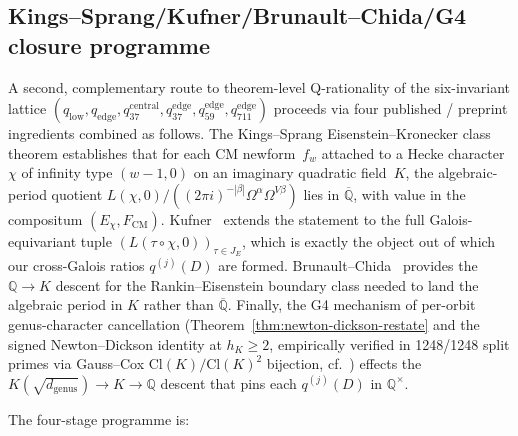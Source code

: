 \documentclass[11pt]{amsart}
\theoremstyle{definition}
\theoremstyle{remark}
\newcommand{\Q}{\mathbb{Q}}
\begin{document}
\subsection{Kings--Sprang/Kufner/Brunault--Chida/G4 closure programme}
\label{ss:ks-kufner-bc-g4}

A second, complementary route to theorem-level Q-rationality of the
six-invariant lattice $(q_{\mathrm{low}}, q_{\mathrm{edge}},
q_{37}^{\mathrm{central}}, q_{37}^{\mathrm{edge}}, q_{59}^{\mathrm{edge}},
q_{711}^{\mathrm{edge}})$ proceeds via four published / preprint
ingredients combined as follows. The Kings--Sprang
Eisenstein--Kronecker class theorem
\cite{KingsSprang2025} establishes that for each CM newform~$f_w$
attached to a Hecke character $\chi$ of infinity type $(w-1, 0)$ on
an imaginary quadratic field~$K$, the algebraic-period quotient
$L(\chi, 0)/((2\pi i)^{-|\beta|} \Omega^\alpha \Omega^{V\beta})$ lies
in $\overline{\Q}$, with value in the compositum
$(E_\chi, F_{\mathrm{CM}})$. Kufner~\cite{Kufner2024} extends the
statement to the full Galois-equivariant tuple
$(L(\tau \circ \chi, 0))_{\tau \in J_E}$, which is exactly the object
out of which our cross-Galois ratios $q^{(j)}(D)$ are formed.
Brunault--Chida~\cite{BrunaultChida2015} provides the
$\Q \to K$ descent for the Rankin--Eisenstein boundary class needed
to land the algebraic period in $K$ rather than $\overline{\Q}$.
Finally, the G4 mechanism of per-orbit genus-character cancellation
(Theorem~\ref{thm:newton-dickson-restate} and the signed Newton--Dickson
identity at $h_K \geq 2$, empirically verified in 1248/1248 split
primes via Gauss--Cox $\mathrm{Cl}(K)/\mathrm{Cl}(K)^2$ bijection,
cf.\ \cite{OPNewtonDicksonSigned2026}) effects the
$K(\sqrt{d_{\mathrm{genus}}}) \to K \to \Q$ descent that pins each
$q^{(j)}(D)$ in $\Q^\times$.

\medskip
The four-stage programme is:
\end{document}
